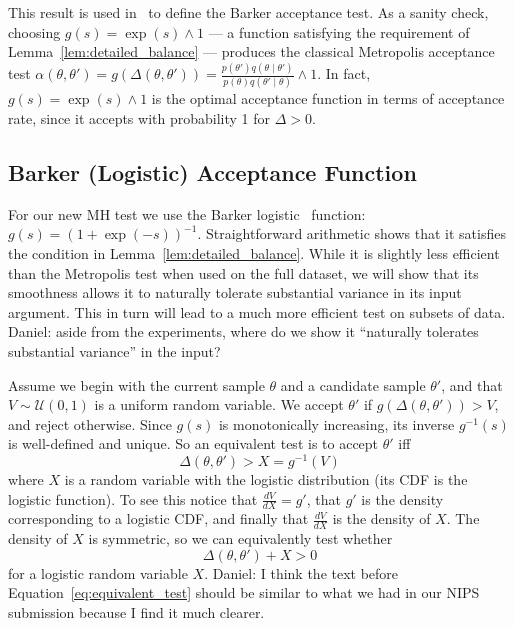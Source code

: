 \documentclass{article}
\begin{document}
This result is used in~\cite{Barker65} to define the Barker acceptance test.  As
a sanity check, choosing $g(s) = \exp(s) \wedge 1$ --- a function satisfying the
requirement of Lemma~\ref{lem:detailed_balance} --- produces the classical
Metropolis acceptance test $\alpha(\theta,\theta') = g(\Delta(\theta,\theta')) =
\frac{p(\theta')q(\theta \mid \theta')}{p(\theta)q(\theta' \mid \theta)}\wedge
1$. In fact, $g(s) =\exp(s) \wedge 1$ is the optimal acceptance function in
terms of acceptance rate, since it accepts with probability 1 for $\Delta > 0$.

\subsection{Barker (Logistic) Acceptance Function}\label{ssec:barker_function}
For our new MH test we use the Barker logistic~\cite{Barker65} function:
$g(s)=(1+\exp(-s))^{-1}$. Straightforward arithmetic shows that it satisfies the
condition in Lemma~\ref{lem:detailed_balance}.  While it is slightly less
efficient than the Metropolis test when used on the full dataset, we will show
that its smoothness allows it to naturally tolerate substantial variance in its
input argument. This in turn will lead to a much more efficient test on subsets
of data. {\color{blue} Daniel: aside from the experiments, where do we show it
``naturally tolerates substantial variance'' in the input?} 

Assume we begin with the current sample $\theta$ and a candidate sample
$\theta'$, and that $V \sim \mathcal{U}(0,1)$ is a uniform random variable. We
accept $\theta'$ if $g(\Delta(\theta,\theta')) > V$, and reject otherwise.
Since $g(s)$ is monotonically increasing, its inverse $g^{-1}(s)$ is
well-defined and unique. So an equivalent test is to accept $\theta'$ iff
\begin{equation}\label{eq:equivalent_test}
    \Delta(\theta,\theta') > X = g^{-1}(V)
\end{equation}
where $X$ is a random variable with the logistic distribution (its CDF is the
logistic function). To see this notice that $\frac{dV}{dX} = g'$, that $g'$ is
the density corresponding to a logistic CDF, and finally that $\frac{dV}{dX}$ is
the density of $X$. The density of $X$ is symmetric, so we can equivalently test
whether
\begin{equation}\label{eq:the_exact_test}
    \Delta(\theta,\theta') + X > 0
\end{equation}
for a logistic random variable $X$. {\color{blue} Daniel: I think the text
before Equation~\ref{eq:equivalent_test} should be similar to what we had in
our NIPS submission because I find it much clearer.}
\end{document}
